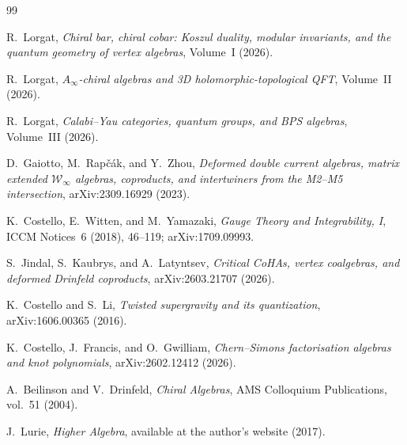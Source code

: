 \documentclass[11pt]{article}
\theoremstyle{remark}
\begin{document}
\begin{thebibliography}{99}

R.~Lorgat,
\textit{Chiral bar, chiral cobar: Koszul duality, modular invariants,
  and the quantum geometry of vertex algebras},
Volume~I (2026).

R.~Lorgat,
\textit{$A_\infty$-chiral algebras and 3D holomorphic-topological QFT},
Volume~II (2026).

R.~Lorgat,
\textit{Calabi--Yau categories, quantum groups, and BPS algebras},
Volume~III (2026).

D.~Gaiotto, M.~Rap\v{c}\'ak, and Y.~Zhou,
\textit{Deformed double current algebras, matrix extended
  $\mathcal{W}_\infty$ algebras, coproducts, and intertwiners from
  the M2--M5 intersection},
arXiv:2309.16929 (2023).

K.~Costello, E.~Witten, and M.~Yamazaki,
\textit{Gauge Theory and Integrability, I},
ICCM Notices~6 (2018), 46--119; arXiv:1709.09993.

S.~Jindal, S.~Kaubrys, and A.~Latyntsev,
\textit{Critical CoHAs, vertex coalgebras, and deformed Drinfeld
  coproducts},
arXiv:2603.21707 (2026).

K.~Costello and S.~Li,
\textit{Twisted supergravity and its quantization},
arXiv:1606.00365 (2016).

K.~Costello, J.~Francis, and O.~Gwilliam,
\textit{Chern--Simons factorisation algebras and knot polynomials},
arXiv:2602.12412 (2026).

A.~Beilinson and V.~Drinfeld,
\textit{Chiral Algebras},
AMS Colloquium Publications, vol.~51 (2004).

J.~Lurie,
\textit{Higher Algebra},
available at the author's website (2017).

\end{thebibliography}
\end{document}
